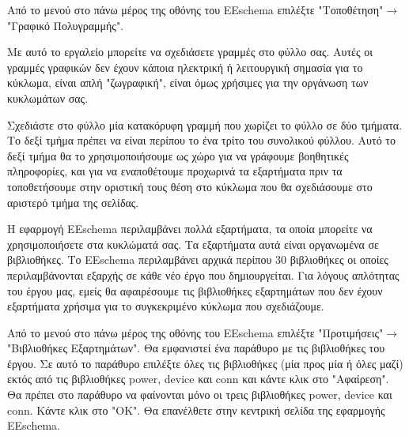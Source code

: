 \documentclass[a4paper]{article}
\begin{document}
\begin{figure}
  \begin{center}
    \label{fig:kicad-main}
  \end{center}
\end{figure}

Από το μενού στο πάνω μέρος της οθόνης του EEschema επιλέξτε "Τοποθέτηση"$\rightarrow$"Γραφικό Πολυγραμμής".

Με αυτό το εργαλείο μπορείτε να σχεδιάσετε γραμμές στο φύλλο σας. Αυτές οι γραμμές γραφικών δεν έχουν κάποια ηλεκτρική ή λειτουργική σημασία για το κύκλωμα, είναι απλή "ζωγραφική", είναι όμως χρήσιμες για την οργάνωση των κυκλωμάτων σας.

Σχεδιάστε στο φύλλο μία κατακόρυφη γραμμή που χωρίζει το φύλλο σε δύο τμήματα. Το δεξί τμήμα πρέπει να είναι περίπου το ένα τρίτο του συνολικού φύλλου. Αυτό το δεξί τμήμα θα το χρησιμοποιήσουμε ως χώρο για να γράφουμε  βοηθητικές πληροφορίες, και για να εναποθέτουμε προχωρινά τα εξαρτήματα πριν τα τοποθετήσουμε στην οριστική τους θέση στο κύκλωμα που θα σχεδιάσουμε στο αριστερό τμήμα της σελίδας.

\begin{figure}
  \begin{center}
    \label{fig:kicad-main}
  \end{center}
\end{figure}

Η εφαρμογή EEschema περιλαμβάνει πολλά εξαρτήματα, τα οποία μπορείτε να χρησιμοποιήσετε στα κυκλώματά σας. Τα εξαρτήματα αυτά είναι οργανωμένα σε βιβλιοθήκες. Το EEschema περιλαμβάνει αρχικά περίπου 30 βιβλιοθήκες οι οποίες περιλαμβάνονται εξαρχής σε κάθε νέο έργο που δημιουργείται. Για λόγους απλότητας του έργου μας, εμείς θα αφαιρέσουμε τις βιβλιοθήκες εξαρτημάτων που δεν έχουν εξαρτήματα χρήσιμα για το συγκεκριμένο κύκλωμα που σχεδιάζουμε.

Από το μενού στο πάνω μέρος της οθόνης του EEschema επιλέξτε "Προτιμήσεις"$\rightarrow$"Βιβλιοθήκες Εξαρτημάτων". Θα εμφανιστεί ένα παράθυρο με τις βιβλιοθήκες του έργου. Σε αυτό το παράθυρο επιλέξτε όλες τις βιβλιοθήκες (μία προς μία ή όλες μαζί) εκτός από τις βιβλιοθήκες power, device και conn και κάντε κλικ στο "Αφαίρεση". Θα πρέπει στο παράθυρο να φαίνονται μόνο οι τρεις βιβλιοθήκες power, device και conn. Κάντε κλικ στο "ΟΚ". Θα επανέλθετε στην κεντρική σελίδα της εφαρμογής EEschema.
\end{document}
